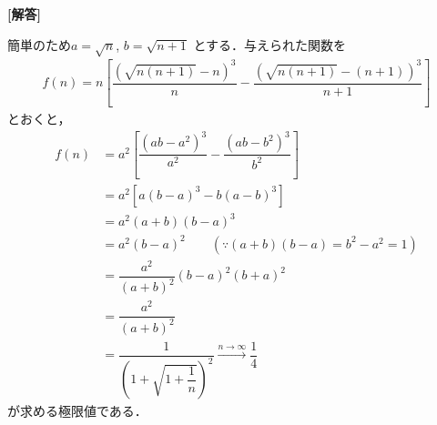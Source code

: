 \documentclass[../../main.tex]{subfiles}
\begin{document}
\begin{oframed}
  
\end{oframed}

{\bf [解答]}

簡単のため$a = \sqrt{n}$, $b = \sqrt{n+1}$ とする．与えられた関数を
\begin{align}
  f(n) = n \left[ \dfrac{ { (\sqrt{n(n+1)}-n) }^3 }{n} -
  \dfrac{ { (\sqrt{n(n+1)}-(n+1)) }^3 }{n+1} \right]
\end{align}
とおくと，
\begin{align}
  f(n)
  &= a^2 \left[ \dfrac{(ab - a^2)^3}{a^2} - \dfrac{(ab - b^2)^3}{b^2} \right] \\
  &= a^2 \left[ a(b - a)^3 - b(a - b)^3 \right] \\
  &= a^2 (a + b)(b - a)^3 \\
  &= a^2 (b - a)^2 \qquad (\because (a + b)(b - a) = b^2 - a^2 = 1) \\
  &= \dfrac{a^2}{(a + b)^2} (b - a)^2 (b + a)^2 \\
  &= \dfrac{a^2}{(a + b)^2} \\
  &= \dfrac{1}{\left(1 + \sqrt{1 + \dfrac{1}{n}}\right)^2}
  \xrightarrow{n \to \infty} \dfrac{1}{4}
\end{align}
が求める極限値である．

\newpage
\end{document}
